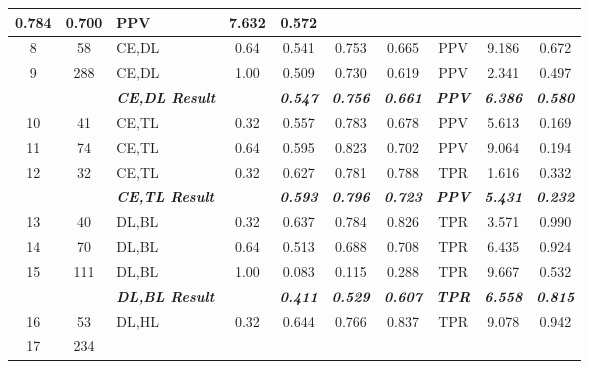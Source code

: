 \begin{table}[H]
{\begin{tabular}{cc|l|c|c|c|c|c|c|c|}
    0.784 &
    0.700 &
    PPV &
    7.632 &
    0.572 \\ \hline
  \multicolumn{1}{|c|}{8} &
    58 &
    CE,DL &
    0.64 &
    0.541 &
    0.753 &
    0.665 &
    PPV &
    9.186 &
    0.672 \\ \hline
  \multicolumn{1}{|c|}{9} &
    288 &
    CE,DL &
    1.00 &
    0.509 &
    0.730 &
    0.619 &
    PPV &
    2.341 &
    0.497 \\ \hline
   &
     &
    \textit{\textbf{CE,DL Result}} &
     &
    \textit{\textbf{0.547}} &
    \textit{\textbf{0.756}} &
    \textit{\textbf{0.661}} &
    \textit{\textbf{PPV}} &
    \textit{\textbf{6.386}} &
    \textit{\textbf{0.580}} \\ \hline
  \multicolumn{1}{|c|}{10} &
    41 &
    CE,TL &
    0.32 &
    0.557 &
    0.783 &
    0.678 &
    PPV &
    5.613 &
    0.169 \\ \hline
  \multicolumn{1}{|c|}{11} &
    74 &
    CE,TL &
    0.64 &
    0.595 &
    0.823 &
    0.702 &
    PPV &
    9.064 &
    0.194 \\ \hline
  \multicolumn{1}{|c|}{12} &
    32 &
    CE,TL &
    0.32 &
    0.627 &
    0.781 &
    0.788 &
    TPR &
    1.616 &
    0.332 \\ \hline
   &
     &
    \textit{\textbf{CE,TL Result}} &
     &
    \textit{\textbf{0.593}} &
    \textit{\textbf{0.796}} &
    \textit{\textbf{0.723}} &
    \textit{\textbf{PPV}} &
    \textit{\textbf{5.431}} &
    \textit{\textbf{0.232}} \\ \hline
  \multicolumn{1}{|c|}{13} &
    40 &
    DL,BL &
    0.32 &
    0.637 &
    0.784 &
    0.826 &
    TPR &
    3.571 &
    0.990 \\ \hline
  \multicolumn{1}{|c|}{14} &
    70 &
    DL,BL &
    0.64 &
    0.513 &
    0.688 &
    0.708 &
    TPR &
    6.435 &
    0.924 \\ \hline
  \multicolumn{1}{|c|}{15} &
    111 &
    DL,BL &
    1.00 &
    0.083 &
    0.115 &
    0.288 &
    TPR &
    9.667 &
    0.532 \\ \hline
   &
     &
    \textit{\textbf{DL,BL Result}} &
     &
    \textit{\textbf{0.411}} &
    \textit{\textbf{0.529}} &
    \textit{\textbf{0.607}} &
    \textit{\textbf{TPR}} &
    \textit{\textbf{6.558}} &
    \textit{\textbf{0.815}} \\ \hline
  \multicolumn{1}{|c|}{16} &
    53 &
    DL,HL &
    0.32 &
    0.644 &
    0.766 &
    0.837 &
    TPR &
    9.078 &
    0.942 \\ \hline
  \multicolumn{1}{|c|}{17} &
    234 &

\end{tabular}}
\end{table}
